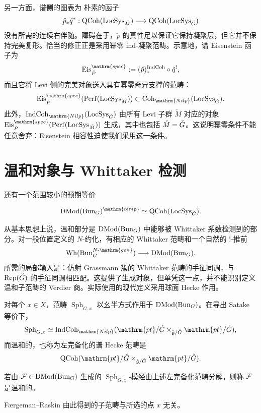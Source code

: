 另一方面，谱侧的图表为
朴素的函子
\[\check p_*\check q^*:\operatorname{QCoh}(\operatorname{LocSys}_{\check M})\longrightarrow\operatorname{QCoh}(\operatorname{LocSys}_{\check{G}})\]
没有所需的连续右伴随。障碍在于，$\check p$ 的真性足以保证它保持凝聚层，但它并不保持完美复形。恰当的修正正是采用幂零 ind-凝聚范畴。示意地，谱 Eisenstein 函子为
\[\operatorname{Eis}^{\mathrm{spec}}_{\check P}:=(\check p)_*^{\IndCoh}\circ\check q^!,\]
而且它将 Levi 侧的完美对象送入具有幂零奇异支撑的范畴：
\[\operatorname{Eis}^{\mathrm{spec}}_{\check P}(\operatorname{Perf}(\LocSys_{\check M}))\subset\Coh_{\mathrm{Nilp}}(\LocSys_{\checkG}).\]
此外，$\IndCoh_{\mathrm{Nilp}}(\LocSys_{\checkG})$ 由所有 Levi 子群 $\check M$ 对应的对象 $\operatorname{Eis}^{\mathrm{spec}}_{\check P}(\operatorname{Perf}(\LocSys_{\check M}))$ 生成，其中也包括 $\check M=\check{G}$。这说明幂零条件不能任意舍弃：Eisenstein 相容性迫使我们采用这一条件。

\section{温和对象与 Whittaker 检测}\label{sec:10.5}
还有一个范围较小的预期等价
\begin{conjecture*}{}
\[\DMod(\Bun_G)^{\mathrm{temp}}\simeq\QCoh(\LocSys_{\checkG}).\]
\end{conjecture*}
从基本思想上说，温和部分是 $\operatorname{DMod}(\operatorname{Bun}_G)$ 中能够被 Whittaker 系数检测到的部分。对一般位置定义的 $N$-约化，有相应的 Whittaker 范畴和一个自然的 $!$-推前
\[\operatorname{Wh}(\Bun_G^{N\text{-}\mathrm{gen}})\longrightarrow\DMod(\Bun_G).\]
所需的局部输入是：仿射 Grassmann 簇的 Whittaker 范畴的手征同调，与 $\operatorname{Rep}(\check{G})$ 的手征同调相匹配。这提供了生成对象，但单凭这一点，并不能识别定义温和子范畴的 Verdier 商。实际使用的现代定义采用球面 Hecke 作用。

对每个 $x\in X$，范畴 $\operatorname{Sph}_{G,x}$ 以幺半方式作用于 $\operatorname{DMod}(\operatorname{Bun}_G)$。在导出 Satake 等价下，
\[\operatorname{Sph}_{G,x}\simeq\IndCoh_{\mathrm{Nilp}}(\mathrm{pt}/\checkG\times_{\check{\mathfrak g}/\checkG}\mathrm{pt}/\checkG),\]
而温和的，也称为左完备化的谱 Hecke 范畴是
\[\QCoh(\mathrm{pt}/\checkG\times_{\check{\mathfrak g}/\checkG}\mathrm{pt}/\checkG).\]
\begin{definition*}{}
若由 $\mathcal{F}\in\operatorname{DMod}(\operatorname{Bun}_G)$ 生成的 $\operatorname{Sph}_{G,x}$-模经由上述左完备化范畴分解，则称 $\mathcal{F}$ 是温和的。
\end{definition*}
\begin{theorem*}{Færgeman–Raskin\cite{FR23}}
由此得到的子范畴与所选的点 $x$ 无关。
\end{theorem*}

